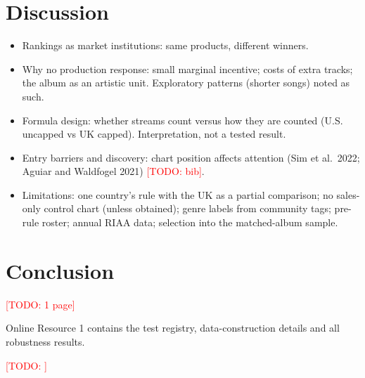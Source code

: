 \documentclass[pdflatex,sn-apa]{sn-jnl}
\newcommand{\todo}[1]{\textcolor{red}{[TODO: #1]}}
\begin{document}
\section{Discussion}\label{sec:discussion}
\begin{itemize}
  \item Rankings as market institutions: same products, different winners.
  \item Why no production response: small marginal incentive; costs of extra tracks; the album as an artistic unit. Exploratory patterns (shorter songs) noted as such.
  \item Formula design: whether streams count versus how they are counted (U.S. uncapped vs UK capped). Interpretation, not a tested result.
  \item Entry barriers and discovery: chart position affects attention (Sim et al.\ 2022; Aguiar and Waldfogel 2021) \todo{bib}.
  \item Limitations: one country's rule with the UK as a partial comparison; no sales-only control chart (unless obtained); genre labels from community tags; pre-rule roster; annual RIAA data; selection into the matched-album sample.
\end{itemize}

\section{Conclusion}\label{sec:conclusion}
\todo{1 page}

\backmatter

Online Resource 1 contains the test registry, data-construction details and all robustness results.

\todo{}
\end{document}
